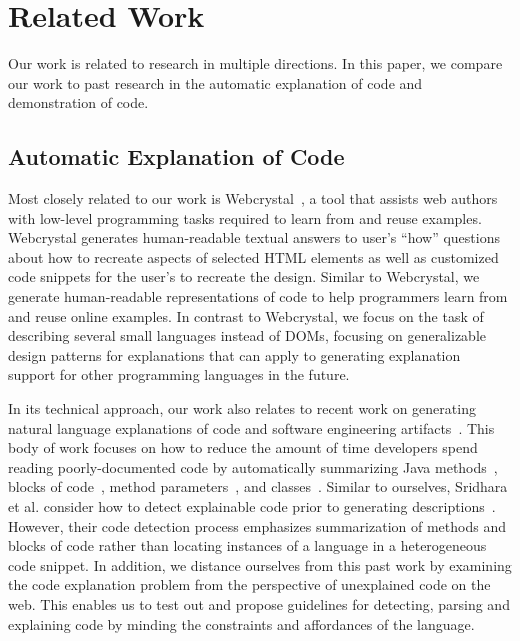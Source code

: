 \section{Related Work}

Our work is related to research in multiple directions.
In this paper, we compare our work to past research in the automatic explanation of code and demonstration of code.

\subsection{Automatic Explanation of Code}

Most closely related to our work is Webcrystal~\cite{chang_webcrystal_2012}, a tool that assists web authors with low-level programming tasks required to learn from and reuse examples.  
Webcrystal generates human-readable textual answers to user's ``how'' questions about how to recreate aspects of selected HTML elements as well as customized code snippets for the user's to recreate the design.
Similar to Webcrystal, we generate human-readable representations of code to help programmers learn from and reuse online examples.
In contrast to Webcrystal, we focus on the task of describing several small languages instead of DOMs, focusing on generalizable design patterns for explanations that can apply to generating explanation support for other programming languages in the future.

In its technical approach, our work also relates to recent work on generating natural language explanations of code and software engineering artifacts~\cite{sridhara_automatically_2011,burden_natural_2011,sridhara_towards_2010,kamimura_towards_2013,mcburney_automatic_2014,sridhara_generating_2011,haiduc_supporting_2010,moreno_automatic_2013}.
This body of work focuses on how to reduce the amount of time developers spend reading poorly-documented code by automatically summarizing Java methods~\cite{sridhara_towards_2010}, blocks of code~\cite{sridhara_automatically_2011}, method parameters~\cite{sridhara_generating_2011}, and classes~\cite{moreno_automatic_2013}.
Similar to ourselves, Sridhara et al. consider how to detect explainable code prior to generating descriptions~\cite{sridhara_automatically_2011,sridhara_towards_2010}.
However, their code detection process emphasizes summarization of methods and blocks of code rather than locating instances of a language in a heterogeneous code snippet.
In addition, we distance ourselves from this past work by examining the code explanation problem from the perspective of unexplained code on the web.
This enables us to test out and propose guidelines for detecting, parsing and explaining code by minding the constraints and affordances of the language.

